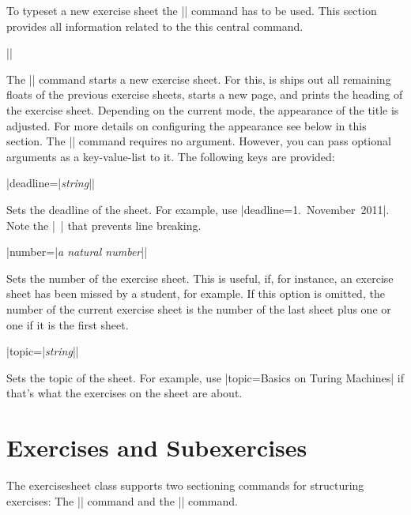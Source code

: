 \documentclass[a4paper,fleqn]{report}
\def\exercisesheet{{exercisesheet}}
\def\syntaxdefaultarg#1{\hfill\texttt{\small #1}\par\smallskip\noindent\ignorespaces}
\def\metaargument#1{\textit{\small #1}}
\begin{document}
To typeset a new exercise sheet the |\sheet| command has to be used.
This section provides all information related to the this central
command.

\begin{syntax}

  |\sheet[|\metaargument{key-value-list}|]| \syntaxdefaultarg{} The
  |\sheet| command starts a new exercise sheet. For this, is ships out
  all remaining floats of the previous exercise sheets, starts a new
  page, and prints the heading of the exercise sheet. Depending on the
  current mode, the appearance of the title is adjusted. For more
  details on configuring the appearance see below in this section.
  The |\sheet| command requires no argument. However, you can pass
  optional arguments as a key-value-list to it. The following keys are
  provided:
  \begin{syntax}
    |deadline={|\metaargument{string}|}| \syntaxdefaultarg{}
    Sets the deadline of the sheet. For example, use 
    |deadline={1.~November~2011}|. Note the |~| that prevents line
    breaking.
  \end{syntax}
  \begin{syntax}
    |number={|\metaargument{a natural number}|}| \syntaxdefaultarg{}
    Sets the number of the exercise sheet. This is useful, if, for
    instance, an exercise sheet has been missed by a student, for
    example. If this option is omitted, the number of the current
    exercise sheet is the number of the last sheet plus one or one if
    it is the first sheet.
  \end{syntax}
  \begin{syntax}
    |topic={|\metaargument{string}|}| \syntaxdefaultarg{}
    Sets the topic of the sheet. For example, use 
    |topic={Basics on Turing Machines}| if that's what the exercises
    on the sheet are about.
  \end{syntax}
\end{syntax}


\section{Exercises and Subexercises}

The \exercisesheet{} class supports two sectioning commands for
structuring exercises: The |\exercise| command and the |\subexercise|
command.
\end{document}
